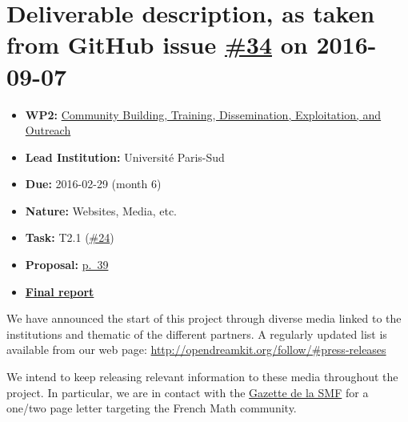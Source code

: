 \section*{\texorpdfstring{Deliverable description, as taken from GitHub
issue
\href{https://github.com/OpenDreamKit/OpenDreamKit/issues/34}{\#34} on
2016-09-07}{Deliverable description, as taken from GitHub issue \#34 on 2016-09-07}}\label{deliverable-description-as-taken-from-github-issues-34-on-2016-09-07}

\begin{itemize}
\tightlist
\item
  \textbf{WP2:}
  \href{https://github.com/OpenDreamKit/OpenDreamKit/tree/master/WP2}{Community
  Building, Training, Dissemination, Exploitation, and Outreach}
\item
  \textbf{Lead Institution:} Université Paris-Sud
\item
  \textbf{Due:} 2016-02-29 (month 6)
\item
  \textbf{Nature:} Websites, Media, etc.
\item
  \textbf{Task:} T2.1
  (\href{https://github.com/OpenDreamKit/OpenDreamKit/issues/24}{\#24})
\item
  \textbf{Proposal:}
  \href{https://github.com/OpenDreamKit/OpenDreamKit/raw/master/Proposal/proposal-www.pdf}{p.~39}
\item
  \textbf{\href{https://github.com/OpenDreamKit/OpenDreamKit/raw/master/WP2/D2.1/report-final.pdf}{Final
  report}}
\end{itemize}

We have announced the start of this project through diverse media linked
to the institutions and thematic of the different partners. A regularly
updated list is available from our web page:
\url{http://opendreamkit.org/follow/\#press-releases}

We intend to keep releasing relevant information to these media
throughout the project. In particular, we are in contact with the
\href{http://smf.emath.fr/}{Gazette de la SMF} for a one/two page letter
targeting the French Math community.
